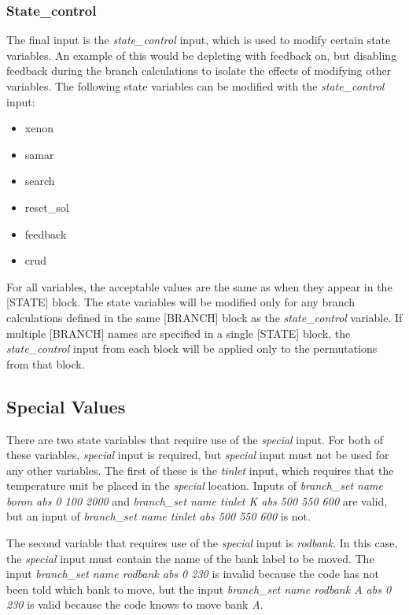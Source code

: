 \subsubsection{State\_control}

The final input is the \emph{state\_control} input, which is used to modify certain state variables.  An example of this would be depleting with feedback on, but disabling feedback during the branch calculations to isolate the effects of modifying other variables.  The following state variables can be modified with the \emph{state\_control} input:
\begin{itemize}[noitemsep]
    \item xenon
    \item samar
    \item search
    \item reset\_sol
    \item feedback
    \item crud
\end{itemize}
For all variables, the acceptable values are the same as when they appear in the [STATE] block.  The state variables will be modified only for any branch calculations defined in the same [BRANCH] block as the \emph{state\_control} variable.  If multiple [BRANCH] names are specified in a single [STATE] block, the \emph{state\_control} input from each block will be applied only to the permutations from that block.

\subsection{Special Values}\label{sec:branch-special-values}

There are two state variables that require use of the \emph{special} input. For both of these variables, \emph{special} input is required, but \emph{special} input must not be used for any other variables.  The first of these is the \emph{tinlet} input, which requires that the temperature unit be placed in the \emph{special} location.  Inputs of \emph{branch\_set name boron abs 0 100 2000} and \emph{branch\_set name tinlet K abs 500 550 600} are valid, but an input of \emph{branch\_set name tinlet abs 500 550 600} is not.

The second variable that requires use of the \emph{special} input is \emph{rodbank}.  In this case, the \emph{special} input must contain the name of the bank label to be moved.  The input \emph{branch\_set name rodbank abs 0 230} is invalid because the code has not been told which bank to move, but the input \emph{branch\_set name rodbank A abs 0 230} is valid because the code knows to move bank \emph{A}.

